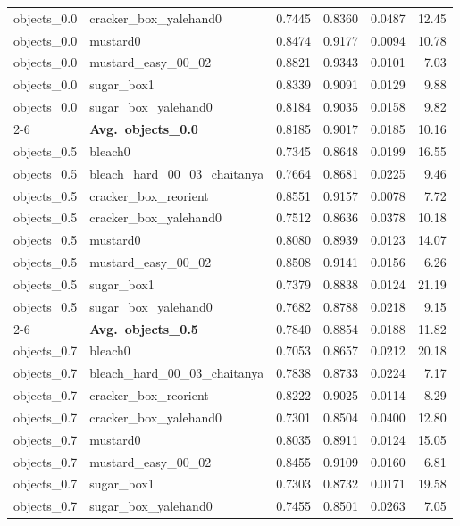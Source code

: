 \begin{longtable}{llrrrr}
  objects_0.0 & cracker\_box\_yalehand0 & 0.7445 & 0.8360 & 0.0487 & 12.45 \\
  objects_0.0 & mustard0 & 0.8474 & 0.9177 & 0.0094 & 10.78 \\
  objects_0.0 & mustard\_easy\_00\_02 & 0.8821 & 0.9343 & 0.0101 & 7.03 \\
  objects_0.0 & sugar\_box1 & 0.8339 & 0.9091 & 0.0129 & 9.88 \\
  objects_0.0 & sugar\_box\_yalehand0 & 0.8184 & 0.9035 & 0.0158 & 9.82 \\
  \cmidrule{2-6}
  & \textbf{Avg.~objects_0.0} & 0.8185 & 0.9017 & 0.0185 & 10.16 \\
  \midrule
  objects_0.5 & bleach0 & 0.7345 & 0.8648 & 0.0199 & 16.55 \\
  objects_0.5 & bleach\_hard\_00\_03\_chaitanya & 0.7664 & 0.8681 & 0.0225 & 9.46 \\
  objects_0.5 & cracker\_box\_reorient & 0.8551 & 0.9157 & 0.0078 & 7.72 \\
  objects_0.5 & cracker\_box\_yalehand0 & 0.7512 & 0.8636 & 0.0378 & 10.18 \\
  objects_0.5 & mustard0 & 0.8080 & 0.8939 & 0.0123 & 14.07 \\
  objects_0.5 & mustard\_easy\_00\_02 & 0.8508 & 0.9141 & 0.0156 & 6.26 \\
  objects_0.5 & sugar\_box1 & 0.7379 & 0.8838 & 0.0124 & 21.19 \\
  objects_0.5 & sugar\_box\_yalehand0 & 0.7682 & 0.8788 & 0.0218 & 9.15 \\
  \cmidrule{2-6}
  & \textbf{Avg.~objects_0.5} & 0.7840 & 0.8854 & 0.0188 & 11.82 \\
  \midrule
  objects_0.7 & bleach0 & 0.7053 & 0.8657 & 0.0212 & 20.18 \\
  objects_0.7 & bleach\_hard\_00\_03\_chaitanya & 0.7838 & 0.8733 & 0.0224 & 7.17 \\
  objects_0.7 & cracker\_box\_reorient & 0.8222 & 0.9025 & 0.0114 & 8.29 \\
  objects_0.7 & cracker\_box\_yalehand0 & 0.7301 & 0.8504 & 0.0400 & 12.80 \\
  objects_0.7 & mustard0 & 0.8035 & 0.8911 & 0.0124 & 15.05 \\
  objects_0.7 & mustard\_easy\_00\_02 & 0.8455 & 0.9109 & 0.0160 & 6.81 \\
  objects_0.7 & sugar\_box1 & 0.7303 & 0.8732 & 0.0171 & 19.58 \\
  objects_0.7 & sugar\_box\_yalehand0 & 0.7455 & 0.8501 & 0.0263 & 7.05 \\

\end{longtable}
